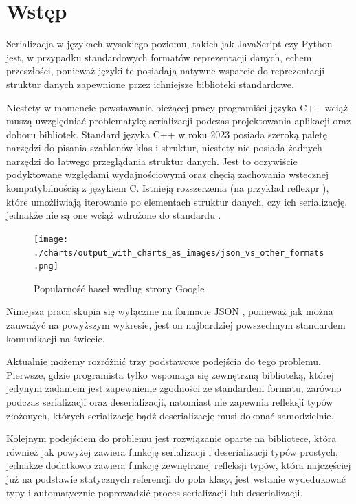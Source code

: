 \documentclass[12pt]{article}
\newcommand{\n}{\newline}
\begin{document}
	{
		\section{Wstęp}

		Serializacja w językach wysokiego poziomu, takich jak JavaScript czy Python jest, w przypadku standardowych formatów
		reprezentacji danych, echem przeszłości, ponieważ języki te posiadają natywne wsparcie do reprezentacji struktur danych
		zapewnione przez ichniejsze biblioteki standardowe.\n

		Niestety w momencie powstawania bieżącej pracy programiści języka C++ wciąż muszą uwzględniać problematykę
		serializacji podczas projektowania aplikacji oraz doboru bibliotek. Standard języka C++ w roku 2023 posiada szeroką
		paletę narzędzi do pisania szablonów klas i struktur, niestety nie posiada żadnych narzędzi do łatwego przeglądania
		struktur danych. Jest to oczywiście podyktowane względami wydajnościowymi oraz chęcią zachowania wstecznej
		kompatybilnością z językiem C. Istnieją rozszerzenia (na przykład reflexpr \cite*{cpp_extension_reflexpr_iso}), które
		umożliwiają iterowanie po elementach struktur danych, czy ich serializację, jednakże nie są one wciąż wdrożone do
		standardu \cite*{cpp_extension_reflexpr_short}.\n

		\begin{figure}[H]
			\centering
			\texttt{[image: ./charts/output\_with\_charts\_as\_images/json\_vs\_other\_formats.png]}
			\caption{Popularność haseł według strony Google \cite*{google_trends_json_api_vs_rest_of_the_world}}
			\medskip
		\end{figure}

		Niniejsza praca skupia się wyłącznie na formacie JSON \cite*{json_iso}, ponieważ jak można zauważyć na powyższym wykresie, jest on
		najbardziej powszechnym standardem komunikacji na świecie.\n

		Aktualnie możemy rozróżnić trzy podstawowe podejścia do tego problemu. Pierwsze, gdzie programista tylko wspomaga się
		zewnętrzną biblioteką, której jedynym zadaniem jest zapewnienie zgodności ze standardem formatu, zarówno podczas serializacji
		oraz deserializacji, natomiast nie zapewnia refleksji typów złożonych, których serializację bądź deserializację musi
		dokonać samodzielnie.\n

		Kolejnym podejściem do problemu jest rozwiązanie oparte na bibliotece, która również jak powyżej zawiera funkcję
		serializacji i deserializacji typów prostych, jednakże dodatkowo zawiera funkcję zewnętrznej refleksji typów,
		która najczęściej już na podstawie statycznych referencji do pola klasy, jest wstanie wydedukować typy i automatycznie
		poprowadzić proces serializacji lub deserializacji.\n

}
\end{document}
